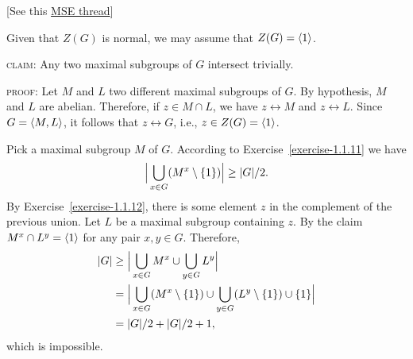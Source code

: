 \begin{solution} {[See this \href{https://math.stackexchange.com/q/1395012/269050}{MSE thread}]} 

Given that $Z(G)$ is normal, we may assume that $Z(G)=\langle1\rangle$.

\textsc{claim:} Any two maximal subgroups of $G$ intersect trivially.

\textsc{proof:}
    Let $M$ and $L$ two different maximal subgroups of $G$. By hypothesis, $M$ and $L$ are abelian. Therefore, if $z\in M\cap L$, we have $z\leftrightarrow M$ and $z\leftrightarrow L$. Since $G=\langle M,L\rangle$, it follows that $z\leftrightarrow G$, i.e., $z\in Z(G)=\langle1\rangle$. \boxed{}


Pick a maximal subgroup $M$ of $G$. According to Exercise~\ref{exercise-1.1.11} we have
$$
    \Big|\bigcup_{x\in G}(M^x\setminus\{1\})\Big|\ge |G|/2.
$$
By Exercise~\ref{exercise-1.1.12}, there is some element $z$ in the complement of the previous union. Let $L$ be a maximal subgroup containing $z$. By the claim $M^x\cap L^y=\langle1\rangle$ for any pair $x,y\in G$. Therefore,
\begin{align*}
    |G| &\ge \Big|\bigcup_{x\in G}M^x\cup\bigcup_{y\in G}L^y\Big|\\
        &= \Big|\bigcup_{x\in G}(M^x\setminus\{1\})\cup
            \bigcup_{y\in G}(L^y\setminus\{1\})\cup\{1\}\Big|\\
        &= |G|/2+|G|/2+1, 
\end{align*}
which is impossible.

\end{solution}


